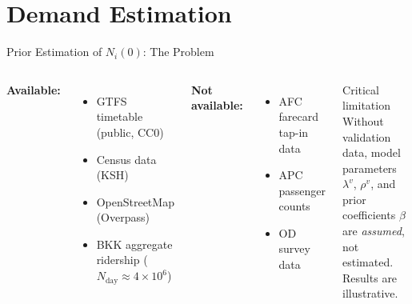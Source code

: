 \documentclass[aspectratio=169,12pt]{beamer}
\begin{document}
\section{Demand Estimation}
\begin{frame}{Prior Estimation of $N_i(0)$: The Problem}
\begin{columns}[T]
\textbf{Available:}
\begin{itemize}
  \item GTFS timetable (public, CC0)
  \item Census data (KSH)
  \item OpenStreetMap (Overpass)
  \item BKK aggregate ridership ($N_{\mathrm{day}}\approx4\times10^6$)
\end{itemize}

\textbf{Not available:}
\begin{itemize}
  \item AFC farecard tap-in data
  \item APC passenger counts
  \item OD survey data
\end{itemize}

\vspace{6pt}
\begin{alertblock}{Critical limitation}
Without validation data, model parameters $\lambda^v$, $\rho^v$, and prior
coefficients $\beta$ are \emph{assumed}, not estimated.
Results are illustrative.
\end{alertblock}
\end{columns}
\end{frame}
\end{document}
